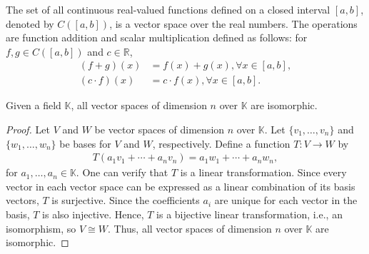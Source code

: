 	\begin{example}
		The set of all continuous real-valued functions defined on a closed interval $[a, b]$, denoted by $C([a, b])$, is a vector space over the real numbers. The operations are function addition and scalar multiplication defined as follows: for $f, g \in C([a, b])$ and $c \in \mathbb{R}$,
		\begin{align*}
		(f + g)(x) &= f(x) + g(x), \forall x \in [a, b], \\
		(c \cdot f)(x) &= c \cdot f(x), \forall x \in [a, b].
		\end{align*}
	\end{example}
	
	\begin{proposition}
		Given a field $\mathbb{K}$, all vector spaces of dimension $n$ over $\mathbb{K}$ are isomorphic.
	\end{proposition}
	
	\begin{proof}
		Let $V$ and $W$ be vector spaces of dimension $n$ over $\mathbb{K}$. Let $\{v_1, \ldots, v_n\}$ and $\{w_1, \ldots, w_n\}$ be bases for $V$ and $W$, respectively. Define a function $T: V \rightarrow W$ by
		\begin{align*}
		T(a_1v_1 + \cdots + a_nv_n) = a_1w_1 + \cdots + a_nw_n,
		\end{align*}
		for $a_1, \ldots, a_n \in \mathbb{K}$. One can verify that $T$ is a linear transformation. Since every vector in each vector space can be expressed as a linear combination of its basis vectors, $T$ is surjective. Since the coefficients $a_i$ are unique for each vector in the basis, $T$ is also injective. Hence, $T$ is a bijective linear transformation, i.e., an isomorphism, so $V \cong W$. Thus, all vector spaces of dimension $n$ over $\mathbb{K}$ are isomorphic.
	\end{proof}
	





